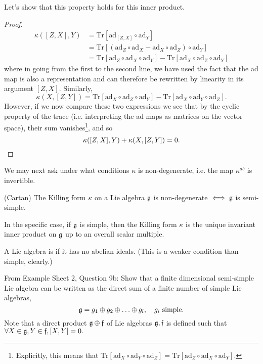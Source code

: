 Let's show that this property holds for this inner product.
\begin{proof}
\begin{align*}
    \kappa([Z,X],Y) &=\text{Tr}[\text{ad}_{[Z,X]}\circ \text{ad}_Y]\\
    &=\text{Tr}[(\text{ad}_Z \circ \text{ad}_X - \text{ad}_X \circ \text{ad}_Z)\circ \text{ad}_Y]\\
    &=\text{Tr}[\text{ad}_Z \circ \text{ad}_X \circ \text{ad}_Y] - \text{Tr}[\text{ad}_X \circ \text{ad}_Z \circ \text{ad}_Y]
\end{align*}
where in going from the first to the second line, we have used the fact that the ad map is also a representation and can therefore be rewritten by linearity in its argument $[Z,X]$.
Similarly,
$$\kappa(X,[Z,Y])=\text{Tr}[\text{ad}_X\circ \text{ad}_Z \circ \text{ad}_Y]-\text{Tr}[\text{ad}_X \circ \text{ad}_Y \circ \text{ad}_Z].$$
However, if we now compare these two expressions we see that by the cyclic property of the trace (i.e. interpreting the ad maps as matrices on the vector space), their sum vanishes\footnote{Explicitly, this means that $\text{Tr}[\text{ad}_X \circ \text{ad}_Y \circ \text{ad}_Z]=\text{Tr}[\text{ad}_Z \circ \text{ad}_X \circ \text{ad}_Y]$.}, and so
\begin{equation*}
    \kappa([Z,X],Y)+\kappa(X,[Z,Y])=0. \qedhere
\end{equation*}
\end{proof}

We may next ask under what conditions $\kappa$ is non-degenerate, i.e. the map $\kappa^{ab}$ is invertible. 
\begin{thm}
(Cartan) The Killing form $\kappa$ on a Lie algebra $\mathfrak{g}$ is non-degenerate $\iff \mathfrak{g}$ is semi-simple.
\end{thm}
In the specific case, if $\mathfrak{g}$ is simple, then the Killing form $\kappa$ is the unique invariant inner product on $\mathfrak{g}$ up to an overall scalar multiple.
\begin{defn}
A Lie algebra is  if it has no abelian ideals. (This is a weaker condition than simple, clearly.)
\end{defn}
\begin{ex}
From Example Sheet 2, Question 9b: Show that a finite dimensional semi-simple Lie algebra can be written as the direct sum of a finite number of simple Lie algebras,
$$\mathfrak{g} = g_1\oplus g_2 \oplus \ldots \oplus g_l, \quad g_i\text{ simple}.$$
Note that a direct product $\mathfrak{g} \oplus \mathfrak{f}$ of Lie algebras $\mathfrak{g},\mathfrak{f}$ is defined such that $\forall X\in \mathfrak{g}, Y \in \mathfrak{f}, [X,Y]=0.$
\end{ex}

